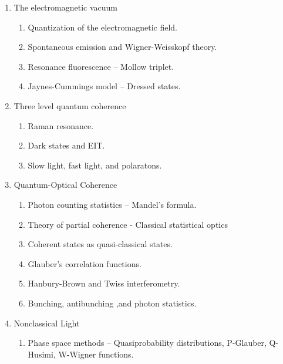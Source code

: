 \documentclass[letterpaper,10pt,english]{sphinxmanual}
\begin{document}
{\begin{enumerate}
\begin{enumerate}
\end{enumerate}

\item {} 
The electromagnetic vacuum
\begin{enumerate}
\item {} 
Quantization of the electromagnetic field.

\item {} 
Spontaneous emission and Wigner-Weisskopf theory.

\item {} 
Resonance fluorescence -- Mollow triplet.

\item {} 
Jaynes-Cummings model -- Dressed states.

\end{enumerate}

\item {} 
Three level quantum coherence
\begin{enumerate}
\item {} 
Raman resonance.

\item {} 
Dark states and EIT.

\item {} 
Slow light, fast light, and polaratons.

\end{enumerate}

\item {} 
Quantum-Optical Coherence
\begin{enumerate}
\item {} 
Photon counting statistics -- Mandel's formula.

\item {} 
Theory of partial coherence - Classical statistical optics

\item {} 
Coherent states as quasi-classical states.

\item {} 
Glauber's correlation functions.

\item {} 
Hanbury-Brown and Twiss interferometry.

\item {} 
Bunching, antibunching ,and photon statistics.

\end{enumerate}

\item {} 
Nonclassical Light
\begin{enumerate}
\item {} 
Phase space methods -- Quasiprobability distributions, P-Glauber, Q-Husimi, W-Wigner functions.


\end{enumerate}
\end{enumerate}}
\end{document}
